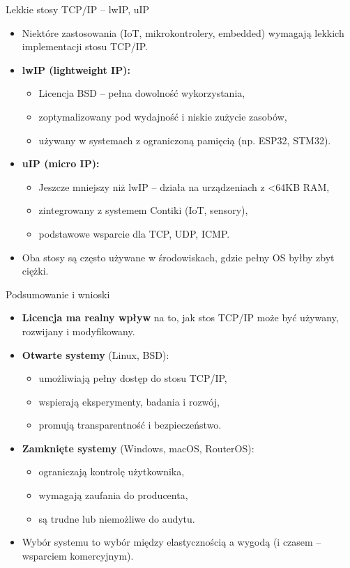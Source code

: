 \documentclass[aspectratio=169]{beamer}
\begin{document}
\begin{frame}{Lekkie stosy TCP/IP – lwIP, uIP}
  \begin{itemize}
    \item Niektóre zastosowania (IoT, mikrokontrolery, embedded) wymagają lekkich implementacji stosu TCP/IP.
    \item \textbf{lwIP (lightweight IP):}
    \begin{itemize}
      \item Licencja BSD – pełna dowolność wykorzystania,
      \item zoptymalizowany pod wydajność i niskie zużycie zasobów,
      \item używany w systemach z ograniczoną pamięcią (np. ESP32, STM32).
    \end{itemize}
    \item \textbf{uIP (micro IP):}
    \begin{itemize}
      \item Jeszcze mniejszy niż lwIP – działa na urządzeniach z <64KB RAM,
      \item zintegrowany z systemem Contiki (IoT, sensory),
      \item podstawowe wsparcie dla TCP, UDP, ICMP.
    \end{itemize}
    \item Oba stosy są często używane w środowiskach, gdzie pełny OS byłby zbyt ciężki.
  \end{itemize}
\end{frame}

\begin{frame}{Podsumowanie i wnioski}
  \begin{itemize}
    \item \textbf{Licencja ma realny wpływ} na to, jak stos TCP/IP może być używany, rozwijany i modyfikowany.
    \item \textbf{Otwarte systemy} (Linux, BSD):
    \begin{itemize}
      \item umożliwiają pełny dostęp do stosu TCP/IP,
      \item wspierają eksperymenty, badania i rozwój,
      \item promują transparentność i bezpieczeństwo.
    \end{itemize}
    \item \textbf{Zamknięte systemy} (Windows, macOS, RouterOS):
    \begin{itemize}
      \item ograniczają kontrolę użytkownika,
      \item wymagają zaufania do producenta,
      \item są trudne lub niemożliwe do audytu.
    \end{itemize}
    \item Wybór systemu to wybór między elastycznością a wygodą (i czasem – wsparciem komercyjnym).
  \end{itemize}
\end{frame}

\pglastframe

\end{document}

